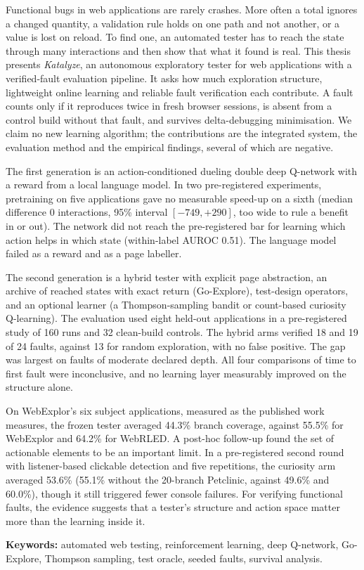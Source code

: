 Functional bugs in web applications are rarely crashes. More often a total ignores a changed
quantity, a validation rule holds on one path and not another, or a value is lost on reload.
To find one, an automated tester has to reach the state through many interactions and then
show that what it found is real. This thesis presents \emph{Katalyze}, an autonomous exploratory tester for web
applications with a verified-fault evaluation pipeline. It asks how much exploration
structure, lightweight online learning and reliable fault verification each contribute.
A fault counts only if it reproduces twice in fresh browser sessions, is absent from a
control build without that fault, and survives delta-debugging minimisation. We claim no
new learning algorithm; the contributions are the integrated system, the evaluation method
and the empirical findings, several of which are negative.

The first generation is an action-conditioned dueling double deep Q-network with a reward
from a local language model. In two pre-registered experiments, pretraining on five
applications gave no measurable speed-up on a sixth (median difference 0 interactions, 95\%
interval $[-749, +290]$, too wide to rule a benefit in or out). The network did not reach
the pre-registered bar for learning which action helps in which state (within-label AUROC
0.51). The language model failed as a reward and as a page labeller.

The second generation is a hybrid tester with explicit page abstraction, an archive of
reached states with exact return (Go-Explore), test-design operators, and an optional
learner (a Thompson-sampling bandit or count-based curiosity Q-learning). The evaluation
used eight held-out applications in a pre-registered study of 160 runs and 32 clean-build
controls. The hybrid arms verified 18 and 19 of 24 faults, against 13 for random
exploration, with no false positive. The gap was largest on faults of moderate declared
depth. All four comparisons of time to first fault were inconclusive, and no learning layer
measurably improved on the structure alone.

On WebExplor's six subject applications, measured as the published work measures, the
frozen tester averaged 44.3\% branch coverage, against 55.5\% for WebExplor and 64.2\% for
WebRLED. A post-hoc follow-up found the set of actionable elements to be an important limit.
In a pre-registered second round with listener-based clickable detection and five
repetitions, the curiosity arm averaged 53.6\% (55.1\% without the 20-branch Petclinic,
against 49.6\% and 60.0\%), though it still triggered fewer console failures. For verifying
functional faults, the evidence suggests that a tester's structure and action space matter
more than the learning inside it.

\vspace{0.5cm}
\noindent\textbf{Keywords:} automated web testing, reinforcement learning, deep Q-network,
Go-Explore, Thompson sampling, test oracle, seeded faults, survival analysis.
